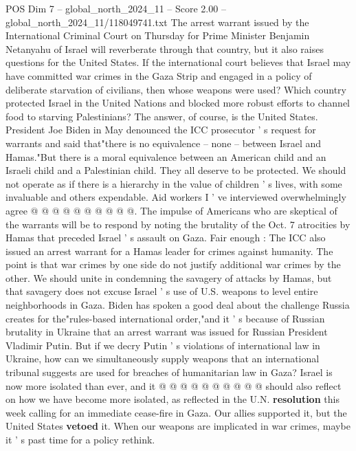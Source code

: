 \begin{textsample}{POS Dim 7 – global\_north\_2024\_11 – Score 2.00 – global\_north\_2024\_11/118049741.txt}  \label{ex:f7_pos_194}
The arrest warrant issued by the International Criminal Court on Thursday for Prime Minister Benjamin Netanyahu of Israel will reverberate through that country, but it also raises questions for the United States.
If the international court believes that Israel may have committed war crimes in the Gaza Strip and engaged in a policy of deliberate starvation of civilians, then whose weapons were used?
Which country protected Israel in the United Nations and blocked more robust efforts to channel food to starving Palestinians?
The answer, of course, is the United States.
President Joe Biden in May denounced the ICC prosecutor ' s request for warrants and said that"there is no equivalence -- none -- between Israel and Hamas."But there is a moral equivalence between an American child and an Israeli child and a Palestinian child.
They all deserve to be protected.
We should not operate as if there is a hierarchy in the value of children ' s lives, with some invaluable and others expendable.
Aid workers I ' ve interviewed overwhelmingly agree @ @ @ @ @ @ @ @ @ @.
The impulse of Americans who are skeptical of the warrants will be to respond by noting the brutality of the Oct. 7 atrocities by Hamas that preceded Israel ' s assault on Gaza.
Fair enough : The ICC also issued an arrest warrant for a Hamas leader for crimes against humanity.
The point is that war crimes by one side do not justify additional war crimes by the other.
We should unite in condemning the savagery of attacks by Hamas, but that savagery does not excuse Israel ' s use of U.S. weapons to level entire neighborhoods in Gaza.
Biden has spoken a good deal about the challenge Russia creates for the"rules-based international order,"and it ' s because of Russian brutality in Ukraine that an arrest warrant was issued for Russian President Vladimir Putin.
But if we decry Putin ' s violations of international law in Ukraine, how can we simultaneously supply weapons that an international tribunal suggests are used for breaches of humanitarian law in Gaza?
Israel is now more isolated than ever, and it @ @ @ @ @ @ @ @ @ @ should also reflect on how we have become more isolated, as reflected in the U.N. \textbf{resolution} this week calling for an immediate cease-fire in Gaza.
Our allies supported it, but the United States \textbf{vetoed} it.
When our weapons are implicated in war crimes, maybe it ' s past time for a policy rethink.

\end{textsample}

